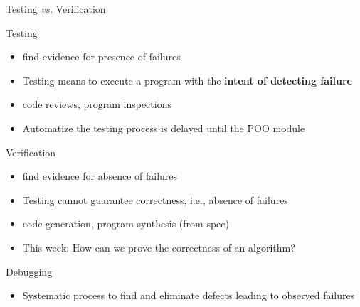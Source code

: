 \begin{frame}{Testing \textit{vs.} Verification}
  \begin{block}{Testing}
    \begin{itemize}
    \item {} find evidence for \alert{presence} of failures
    \item \alert{Testing means to execute a program with the \textbf{intent of
          detecting failure}}
    \item {}  code reviews, program inspections
    \item Automatize the testing process is delayed until the POO module
    \end{itemize}
  \end{block}

  \begin{block}{Verification}
    \begin{itemize}
    \item {} find evidence for \alert{absence} of failures
    \item \alert{Testing cannot guarantee correctness, i.e., absence of
        failures}
    \item {} code generation, program synthesis
      (from spec)
    \item<2->\alert{This week:} How can we prove the correctness of an algorithm?
    \end{itemize}
  \end{block}

  \begin{block}{Debugging}
    \begin{itemize}
    \item Systematic process to find and eliminate defects leading to
      observed failures
    \end{itemize}
  \end{block}
\end{frame}
